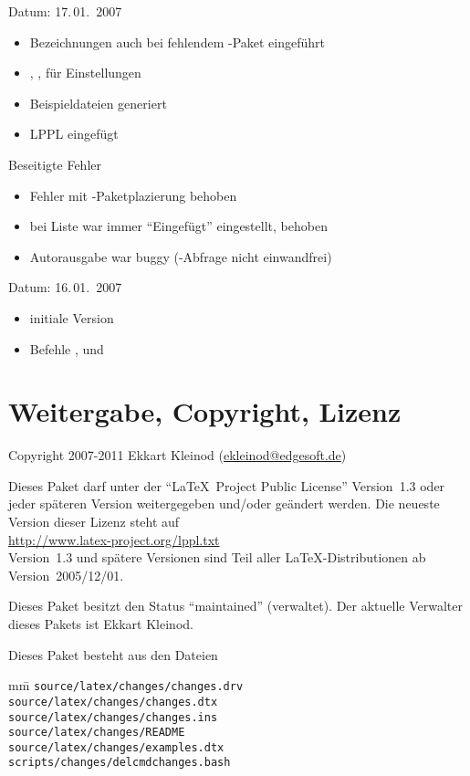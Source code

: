 
Datum: 17.\,01.~2007
\begin{itemize}
	\item Bezeichnungen auch bei fehlendem -Paket eingeführt
	\item {}, ,  für Einstellungen
	\item Beispieldateien generiert
	\item LPPL eingefügt
\end{itemize}
Beseitigte Fehler
\begin{itemize}
	\item Fehler mit -Paketplazierung behoben
	\item bei Liste war immer "`Eingefügt"' eingestellt, behoben
	\item Autorausgabe war buggy (-Abfrage nicht einwandfrei)
\end{itemize}


Datum: 16.\,01.~2007
\begin{itemize}
	\item initiale Version
	\item Befehle ,  und 
\end{itemize}

\section{Weitergabe, Copyright, Lizenz}

Copyright 2007-2011 Ekkart Kleinod (\href{mailto:ekleinod@edgesoft.de}{ekleinod@edgesoft.de})

Dieses Paket darf unter der "`\LaTeX\ Project Public License"' Version~1.3 oder jeder späteren Version weitergegeben und/oder geändert werden.
Die neueste Version dieser Lizenz steht auf\\
\url{http://www.latex-project.org/lppl.txt}\\
Version~1.3 und spätere Versionen sind Teil aller \LaTeX-Distributionen ab Version~2005/12/01.

Dieses Paket besitzt den Status "`maintained"' (verwaltet).
Der aktuelle Verwalter dieses Pakets ist Ekkart Kleinod.

Dieses Paket besteht aus den Dateien

\begin{tabbing}
	mm\=\kill
	\>\texttt{source/latex/changes/changes.drv}\\
	\>\texttt{source/latex/changes/changes.dtx}\\
	\>\texttt{source/latex/changes/changes.ins}\\
	\>\texttt{source/latex/changes/README}\\
	\>\texttt{source/latex/changes/examples.dtx}\\

	\>\texttt{scripts/changes/delcmdchanges.bash}
\end{tabbing}

